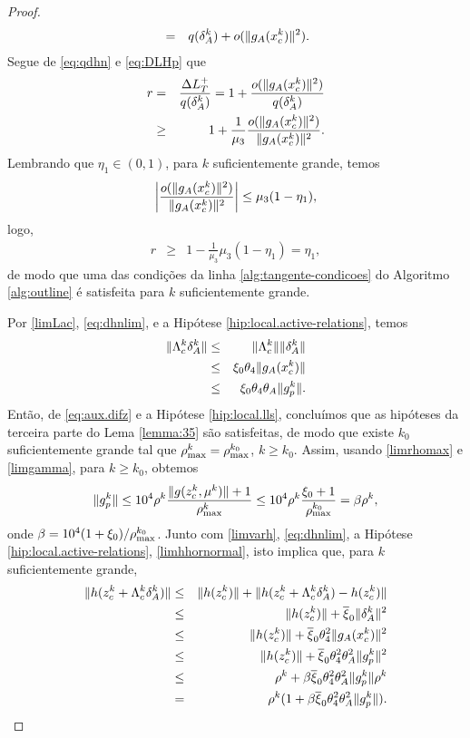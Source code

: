 \begin{proof}
\begin{eqnarray}
& = & q(\delta_A^k) + o(\norma{g_A(\xc{k})}^2). \visiblelbl{eq:DLHp}
\end{eqnarray}
Segue de \eqref{eq:qdhn} e \eqref{eq:DLHp} que
\begin{eqnarray*}
 r & = & \frac{ \Delta L_T^{+} }{ q(\delta_A^k) } = 1 + \frac{ o(\Vert g_A(x_c^{k})\Vert^2) }
{q(\delta_A^k)} \\
& \geq & 1 + \frac{1}{\mu_3}\frac{ o(\Vert g_A(x_c^{k})\Vert^2) }{ \Vert g_A(x_c^{k})\Vert^2 }.
\end{eqnarray*}
Lembrando que $\eta_1 \in(0,1)$, para $k$ suficientemente
grande, temos
$$ \bigg|\frac{ o(\Vert g_A(x_c^{k})\Vert^2) }{ \Vert g_A(x_c^{k})\Vert^2 }\bigg| \leq 
\mu_3(1 - \eta_1), $$
logo,
\begin{eqnarray*}
 r & \geq & 1 - \frac{1}{\mu_3}\mu_3(1 - \eta_1) = \eta_1,
\end{eqnarray*}
de modo que uma das condições da linha \ref{alg:tangente-condicoes} do Algoritmo \ref{alg:outline}
 é satisfeita para $k$ suficientemente grande.

Por \eqref{limLac}, \eqref{eq:dhnlim}, e a Hipótese \ref{hip:local.active-relations}, temos
\begin{eqnarray}
 \norma{\Lambda_c^k\delta_A^k} & \leq & \norma{\Lambda_c^k} \norma{\delta_A^k} \nonumber \\
& \leq & \xi_0\theta_4\norma{g_A(\xc{k})} \nonumber \\
& \leq & \xi_0\theta_4\theta_A\norma{g_p^k}. \visiblelbl{eq:aux.difz}
\end{eqnarray}
Então, de \eqref{eq:aux.difz} e a Hipótese \ref{hip:local.lls}, concluímos que
as hipóteses da terceira parte do Lema \ref{lemma:35} são satisfeitas, de modo
que existe $k_0$ suficientemente grande tal que $\rho_{\max}^k = \rho_{\max}^{k_0}$, $k
\geq k_0$. 
Assim, usando \eqref{limrhomax} e \eqref{limgamma}, para $k \geq k_0$, obtemos
\begin{eqnarray*}
 \Vert g_p^k\Vert \leq 10^4\rho^k\frac{\Vert g(z_c^{k},\mu^{k})\Vert + 1}{\rho_{\max}^k}
\leq 10^4\rho^k\frac{\xi_0 + 1}{\rho_{\max}^{k_0}} = \beta \rho^k,
\end{eqnarray*}
onde  $\beta = 10^4(1+\xi_0)/\rho_{\max}^{k_0}$. 
Junto com \eqref{limvarh}, \eqref{eq:dhnlim}, a 
Hipótese \ref{hip:local.active-relations}, 
\eqref{limhhornormal}, isto implica que, para $k$ suficientemente grande,
\begin{eqnarray}
 \Vert h(z_c^{k} + \Lambda_c^{k}\delta_A^k)\Vert & \leq & \Vert h(z_c^{k})\Vert + 
\Vert h(z_c^{k}+\Lambda_c^{k}\delta_A^k) - h(z_c^{k})\Vert \nonumber \\
& \leq & \Vert h(z_c^{k})\Vert + \overline{\xi}_0\Vert \delta_A^k\Vert^2 \nonumber \\
& \leq & \Vert h(z_c^{k})\Vert + \overline{\xi}_0\theta_4^2\Vert g_A(x_c^{k})\Vert^2 \nonumber \\
& \leq & \Vert h(z_c^{k})\Vert + \overline{\xi}_0\theta_4^2\theta_A^2\Vert g_p^{k}\Vert^2 \nonumber \\
& \leq & \rho^k + \beta\overline{\xi}_0\theta_4^2\theta_A^2\Vert g_p^{k}\Vert\rho^k \nonumber \\
& = & \rho^k (1 + \beta\overline{\xi}_0\theta_4^2\theta_A^2\Vert g_p^{k}\Vert ). \nonumber
\end{eqnarray}


\end{proof}
